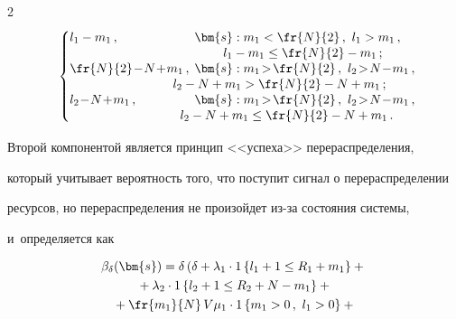 \begin{multicols}{2}
\begin{equation*}
\begin{cases}
  l_1-m_1\,, &\hspace*{-2mm} \bm{s}: m_1<\fr{N}{2}\,,\ l_1>m_1\,,\\[-2pt]


  & \hspace*{6mm}l_1-m_1\leq \fr{N}{2}-m_1\,;\\[-2pt]


  \fr{N}{2}\!-\!N\!+\!m_1\,, & \hspace*{-2mm}\bm{s}: m_1\!>\!\fr{N}{2}\,,\ l_2\!>\!N\!-\!m_1\,,\\[-2pt]


  & \hspace*{-8mm}l_2-N+m_1> \fr{N}{2}-N+m_1\,;\\[-2pt]


  l_2\!-\!N\!+\!m_1\,, &\hspace*{-2mm} \bm{s}: m_1\!>\!\fr{N}{2}\,,\ l_2\!>\!N\!-\!m_1\,,\\[-2pt]


 & \hspace*{-6mm}l_2-N+m_1\leq \fr{N}{2}-N+m_1\,.


\!  \end{cases}\!\!\!




  \end{equation*}


  


  \vspace*{-4pt}


  


  Второй компонентой является принцип <<успеха>> перераспределения, 


который учитывает вероятность того, что поступит сигнал о перераспределении 


ресурсов, но перераспределения не произойдет из-за состояния системы, 


и~определяется как


  \begin{multline*}


  \beta_\delta(\bm{s})= \delta\left( \delta+\lambda_1\cdot 1\left\{ l_1+1\leq 


R_1+m_1\right\} +{}\right.\\


  {}+ \lambda_2\cdot 1\left\{ l_2+1\leq R_2+N-m_1\right\}+{}\\


  {}+


  \fr{m_1}{N}\,V\mu_1\cdot 1\left\{ m_1>0\,,\ l_1>0\right\} +{}\\



\end{multline*}
\end{multicols}
